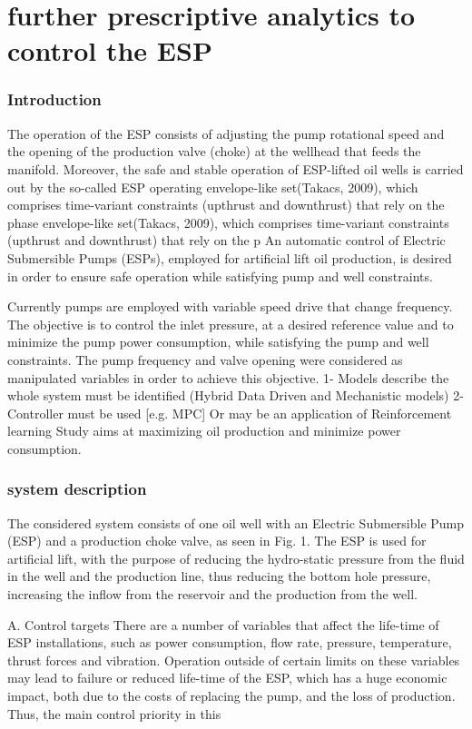 
\chapter{further prescriptive analytics to control the \ac{ESP}}
\subsection{Introduction}
The operation of the ESP consists of adjusting the pump rotational speed and the opening of the production valve (choke) at the wellhead that feeds the manifold. Moreover, the safe and stable operation of ESP-lifted oil wells is carried out by the so-called ESP operating envelope-like set(Takacs, 2009), which comprises time-variant constraints (upthrust and downthrust) that rely on the phase envelope-like set(Takacs, 2009), which comprises time-variant constraints (upthrust and downthrust) that rely on the p An automatic control of Electric Submersible Pumps (ESPs), employed for artificial lift oil production, is desired in order to ensure safe operation while satisfying pump and well constraints. 

Currently pumps are employed with variable speed drive that change frequency. The objective  is  to control the inlet pressure, at a desired  reference value    and    to    minimize    the    pump    power    consumption, while    satisfying    the    pump    and    well    constraints. The pump frequency and valve opening were considered  as  manipulated  variables  in  order  to  achieve  this  objective. 
1- Models describe the whole system must be identified (Hybrid Data Driven and Mechanistic models)
2- Controller must be used [e.g. MPC]
Or may be an application of Reinforcement learning 
Study aims at maximizing oil production and minimize power consumption.

\subsection{system description}

The considered system consists of one oil well with an Electric Submersible Pump (ESP) and a production choke valve, as seen in Fig. 1. The ESP is used for artificial lift, with the purpose of reducing the hydro-static pressure from the fluid in the well and the production line, thus reducing the bottom hole pressure, increasing the inflow from the reservoir
and the production from the well.

A. Control targets
There are a number of variables that affect the life-time of ESP installations, such as power consumption, flow rate, pressure, temperature, thrust forces and vibration. Operation
outside of certain limits on these variables may lead to failure or reduced life-time of the ESP, which has a huge economic impact, both due to the costs of replacing the pump, and the
loss of production. Thus, the main control priority in this

